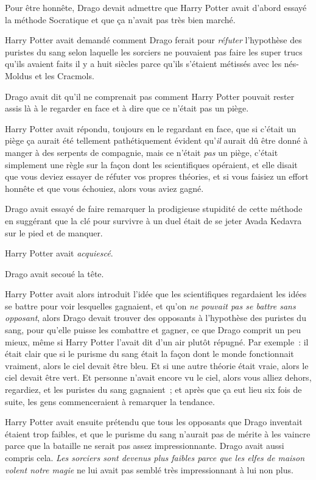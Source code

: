 Pour être honnête, Drago devait admettre que Harry Potter avait d'abord essayé la méthode Socratique et que ça n'avait pas très bien marché.

Harry Potter avait demandé comment Drago ferait pour \emph{réfuter} l'hypothèse des puristes du sang selon laquelle les sorciers ne pouvaient pas faire les super trucs qu'ils avaient faits il y a huit siècles parce qu'ils s'étaient métissés avec les nés-Moldus et les Cracmols.

Drago avait dit qu'il ne comprenait pas comment Harry Potter pouvait rester assis là à le regarder en face et à dire que ce n'était pas un piège.

Harry Potter avait répondu, toujours en le regardant en face, que si c'était un piège ça aurait été tellement pathétiquement évident qu'\emph{il} aurait dû être donné à manger à des serpents de compagnie, mais ce n'était \emph{pas} un piège, c'était simplement une règle sur la façon dont les scientifiques opéraient, et elle disait que vous deviez essayer de réfuter vos propres théories, et si vous faisiez un effort honnête et que vous échouiez, alors vous aviez gagné.

Drago avait essayé de faire remarquer la prodigieuse stupidité de cette méthode en suggérant que la clé pour survivre à un duel était de se jeter Avada Kedavra sur le pied et de manquer.

Harry Potter avait \emph{acquiescé}.

Drago avait secoué la tête.

Harry Potter avait alors introduit l'idée que les scientifiques regardaient les idées se battre pour voir lesquelles gagnaient, et qu'on \emph{ne pouvait pas se battre sans opposant}, alors Drago devait trouver des opposants à l'hypothèse des puristes du sang, pour qu'elle puisse les combattre et gagner, ce que Drago comprit un peu mieux, même si Harry Potter l'avait dit d'un air plutôt répugné. Par exemple~: il était clair que si le purisme du sang était la façon dont le monde fonctionnait vraiment, alors le ciel devait être bleu. Et si une autre théorie était vraie, alors le ciel devait être vert. Et personne n'avait encore vu le ciel, alors vous alliez dehors, regardiez, et les puristes du sang gagnaient~; et après que ça eut lieu six fois de suite, les gens commenceraient à remarquer la tendance.

Harry Potter avait ensuite prétendu que tous les opposants que Drago inventait étaient trop faibles, et que le purisme du sang n'aurait pas de mérite à les vaincre parce que la bataille ne serait pas assez impressionnante. Drago avait aussi compris cela. \emph{Les sorciers sont devenus plus faibles parce que les elfes de maison volent notre magie} ne lui avait pas semblé très impressionnant à lui non plus.

